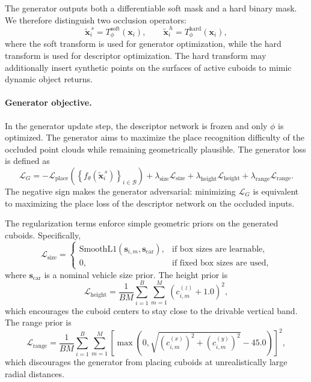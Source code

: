The generator outputs both a differentiable soft mask and a hard binary mask. We therefore distinguish two occlusion
operators:
\begin{equation}
\tilde{\mathbf{x}}^{\,s}_i = T_{\phi}^{\mathrm{soft}}(\mathbf{x}_i),
\qquad
\tilde{\mathbf{x}}^{\,h}_i = T_{\phi}^{\mathrm{hard}}(\mathbf{x}_i),
\end{equation}
where the soft transform is used for generator optimization, while the hard transform is used for descriptor
optimization. The hard transform may additionally insert synthetic points on the surfaces of active cuboids to mimic
dynamic object returns.

\paragraph{Generator objective.}
In the generator update step, the descriptor network is frozen and only $\phi$ is optimized. The generator aims to
maximize the place recognition difficulty of the occluded point clouds while remaining geometrically plausible. The
generator loss is defined as
\begin{equation}
\mathcal{L}_{G}
=
-\mathcal{L}_{\mathrm{place}}
\left(
\left\{
f_{\theta}(\tilde{\mathbf{x}}^{\,s}_i)
\right\}_{i \in \mathcal{B}}
\right)
+
\lambda_{\mathrm{size}} \mathcal{L}_{\mathrm{size}}
+
\lambda_{\mathrm{height}} \mathcal{L}_{\mathrm{height}}
+
\lambda_{\mathrm{range}} \mathcal{L}_{\mathrm{range}}.
\label{eq:generator_loss}
\end{equation}
The negative sign makes the generator adversarial: minimizing $\mathcal{L}_{G}$ is equivalent to maximizing the place
loss of the descriptor network on the occluded inputs.

The regularization terms enforce simple geometric priors on the generated cuboids. Specifically,
\begin{equation}
\mathcal{L}_{\mathrm{size}}
=
\begin{cases}
\mathrm{SmoothL1}\!\left(\mathbf{s}_{i,m}, \mathbf{s}_{\mathrm{car}}\right), & \text{if box sizes are learnable}, \\
0, & \text{if fixed box sizes are used},
\end{cases}
\label{eq:size_prior}
\end{equation}
where $\mathbf{s}_{\mathrm{car}}$ is a nominal vehicle size prior. The height prior is
\begin{equation}
\mathcal{L}_{\mathrm{height}}
=
\frac{1}{BM}
\sum_{i=1}^{B}
\sum_{m=1}^{M}
\left(c^{(z)}_{i,m} + 1.0\right)^2,
\label{eq:height_prior}
\end{equation}
which encourages the cuboid centers to stay close to the drivable vertical band. The range prior is
\begin{equation}
\mathcal{L}_{\mathrm{range}}
=
\frac{1}{BM}
\sum_{i=1}^{B}
\sum_{m=1}^{M}
\left[
\max\!\left(
0,
\sqrt{\left(c^{(x)}_{i,m}\right)^2 + \left(c^{(y)}_{i,m}\right)^2} - 45.0
\right)
\right]^2,
\label{eq:range_prior}
\end{equation}
which discourages the generator from placing cuboids at unrealistically large radial distances.

